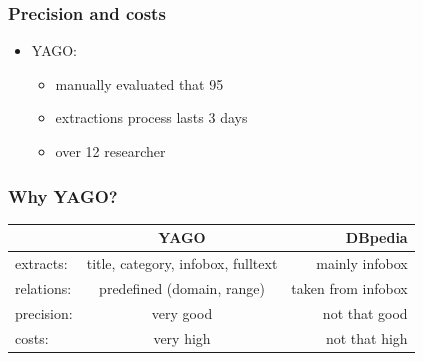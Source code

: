 \begin{frame}
\frametitle{Precision and costs}
\begin{itemize}
\item YAGO:
\begin{itemize}
\item manually evaluated that 95%
\item extractions process lasts 3 days
\item over 12 researcher
\end{itemize}
\end{itemize}
\end{frame}

\begin{frame}
\frametitle{Why YAGO?}
\begin{tabular}{l|c|r}
& YAGO & DBpedia\\
\hline 
extracts: & title, category, infobox, fulltext & mainly infobox\\
relations: & predefined (domain, range) & taken from infobox\\
precision: & very good & not that good \\
costs: & very high & not that high

\end{tabular}
\end{frame}

